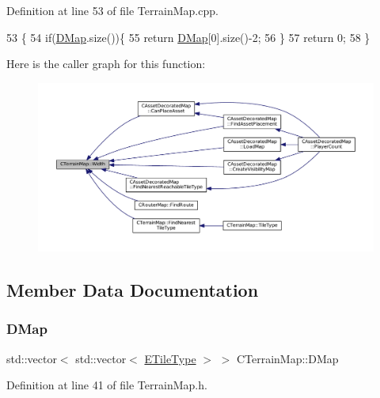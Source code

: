 Definition at line 53 of file Terrain\+Map.\+cpp.


\begin{DoxyCode}
53                             \{
54     \textcolor{keywordflow}{if}(\hyperlink{classCTerrainMap_a80d154ce478948b10473534a7bca13f6}{DMap}.size())\{
55         \textcolor{keywordflow}{return} \hyperlink{classCTerrainMap_a80d154ce478948b10473534a7bca13f6}{DMap}[0].size()-2;
56     \}
57     \textcolor{keywordflow}{return} 0;
58 \}
\end{DoxyCode}
Here is the caller graph for this function\+:
\nopagebreak
\begin{figure}[H]
\begin{center}
\leavevmode
\includegraphics[width=350pt]{classCTerrainMap_a34cb754aa9b26e85a73377159f2527d7_icgraph}
\end{center}
\end{figure}


\subsection{Member Data Documentation}
\hypertarget{classCTerrainMap_a80d154ce478948b10473534a7bca13f6}{}\label{classCTerrainMap_a80d154ce478948b10473534a7bca13f6} 
\subsubsection{\texorpdfstring{D\+Map}{DMap}}
{\footnotesize\ttfamily std\+::vector$<$ std\+::vector$<$ \hyperlink{classCTerrainMap_aff2ab991e237269941416dd79d8871d4}{E\+Tile\+Type} $>$ $>$ C\+Terrain\+Map\+::\+D\+Map\hspace{0.3cm}{\ttfamily [protected]}}



Definition at line 41 of file Terrain\+Map.\+h.

